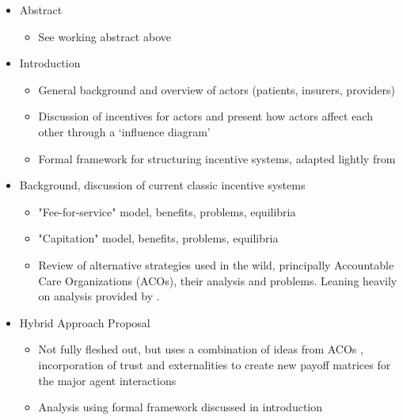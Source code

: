 \documentclass{article}
\begin{document}
\begin{itemize}
    \item Abstract
        \begin{itemize}
            \item See working abstract above
        \end{itemize}
    \item Introduction
        \begin{itemize}
            \item General background and overview of actors (patients, insurers, providers)
            \item Discussion of incentives for actors and present how actors affect each other through a `influence diagram'
            \item Formal framework for structuring incentive systems, adapted lightly from \cite{blended}
        \end{itemize}
    \item Background, discussion of current classic incentive systems
        \begin{itemize}
            \item "Fee-for-service" model, benefits, problems, equilibria
            \item "Capitation" model, benefits, problems, equilibria
            \item Review of alternative strategies used in the wild, principally Accountable Care Organizations (ACOs), their analysis and problems. Leaning heavily on analysis provided by \cite{msdt}.
        \end{itemize}
    \item Hybrid Approach Proposal
        \begin{itemize}
            \item Not fully fleshed out, but uses a combination of ideas from ACOs \cite{mdst}, incorporation of trust \cite{trust} and externalities \cite{blended} to create new payoff matrices for the major agent interactions
            \item Analysis using formal framework discussed in introduction
        \end{itemize}
\end{itemize}

\end{document}
